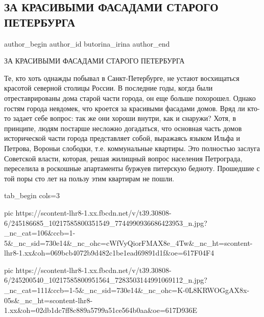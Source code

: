  
 
 
 
 
 
\subsection{ЗА КРАСИВЫМИ ФАСАДАМИ СТАРОГО ПЕТЕРБУРГА}
\label{sec:11_10_2021.fb.butorina_irina.1.staryj_piter}
 
\ifcmt
 author_begin
   author_id butorina_irina
 author_end
\fi

ЗА КРАСИВЫМИ ФАСАДАМИ СТАРОГО ПЕТЕРБУРГА

Те, кто хоть однажды побывал в Санкт-Петербурге, не устают восхищаться красотой
северной столицы России. В последние годы, когда были отреставрированы дома
старой части города, он еще больше похорошел. Однако гостям города невдомек,
что кроется за красивыми фасадами домов. Вряд ли кто-то задает себе вопрос: так
же они хороши внутри, как и снаружи? Хотя, в принципе, людям постарше несложно
догадаться, что основная часть домов исторической части города представляет
собой, выражаясь языком Ильфа и Петрова, Вороньи слободки, т.е. коммунальные
квартиры. Это полностью заслуга Советской власти, которая, решая жилищный
вопрос населения Петрограда, переселила в роскошные апартаменты буржуев
питерскую бедноту. Прошедшие с той поры сто лет на пользу этим квартирам не
пошли.  

\ifcmt
  tab_begin cols=3

     pic https://scontent-lhr8-1.xx.fbcdn.net/v/t39.30808-6/245186685_10217585800351549_7744990936686423953_n.jpg?_nc_cat=106&ccb=1-5&_nc_sid=730e14&_nc_ohc=cWfVyQiorFMAX8e_4Tw&_nc_ht=scontent-lhr8-1.xx&oh=069bcb4072b9d482c1be1ead69891d1f&oe=617F04F4

     pic https://scontent-lhr8-1.xx.fbcdn.net/v/t39.30808-6/245200540_10217585800951564_7283503144991069112_n.jpg?_nc_cat=111&ccb=1-5&_nc_sid=730e14&_nc_ohc=K-0L8KRWOGgAX8x-05s&_nc_ht=scontent-lhr8-1.xx&oh=02db1dc7ff8c889a5799a51ce564b0aa&oe=617D936E


